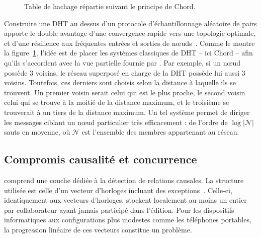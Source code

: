 \begin{figure}
  \begin{center}
    
    \caption[Table de hachage répartie]
    {\label{conclu:fig:dhtexample}Table de hachage répartie suivant le principe
      de Chord.}
  \end{center}
\end{figure}

Construire une DHT au dessus d'un protocole d'échantillonnage aléatoire de pairs
apporte le double avantage d'une convergence rapide vers une topologie optimale,
et d'une résilience aux fréquentes entrées et sorties de
nœuds~\cite{krasikova2016distributed, montresor2005chord,
  voulgaris2013vicinity}.  Comme le montre la
figure~\ref{conclu:fig:dhtexample}, l'idée est de placer les systèmes classiques
de DHT -- ici Chord -- afin qu'ils s'accordent avec la vue partielle fournie par
\SPRAY. Par exemple, si un nœud \SPRAY possède 3 voisins, le réseau superposé en
charge de la DHT possède lui aussi 3 voisins. Toutefois, ces derniers sont
choisis selon la distance à laquelle ils se trouvent. Un premier voisin serait
celui qui est le plus proche, le second voisin celui qui se trouve à la moitié
de la distance maximum, et le troisième se trouverait à un tiers de la distance
maximum. Un tel système permet de diriger les messages ciblant un nœud
particulier très efficacement : de l'ordre de $\log |\mathcal{N}|$ sauts en
moyenne, où $\mathcal{N}$ est l'ensemble des membres appartenant au réseau.



\subsection{Compromis causalité et concurrence}

\CRATE comprend une couche dédiée à la détection de relations causales. La
structure utilisée est celle d'un vecteur d'horloges incluant des
exceptions~\cite{malkhi2007concise}. Celle-ci, identiquement aux vecteurs
d'horloges, stockent localement au moins un entier par collaborateur ayant
jamais participé dans l'édition. Pour les dispositifs informatiques aux
configurations plus modestes comme les téléphones portables, la progression
linéaire de ces vecteurs constitue un problème.

